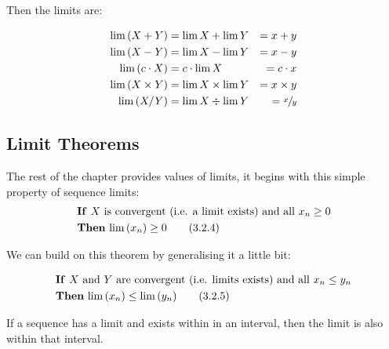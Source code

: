 \documentclass[class=article, crop=false]{standalone}
\begin{document}
Then the limits are:

\begin{alignat}{2}
  \lim  \left( X+Y \right) &= \lim X + \lim Y &= x + y
  \label{addlimdef} \\
  \lim  \left( X-Y \right) &= \lim X - \lim Y &= x - y 
  \label{minlimdef} \\
  \lim  \left( c \cdot X \right) &= c \cdot \lim X  &= c \cdot x
  \label{conmultlimdef} \\
  \lim  \left( X\times Y \right) &= \lim X \times \lim Y &= x \times y
  \label{multlimdef} \\
  \lim  \left( X/Y \right) &= \lim X \div \lim Y &= \sfrac{x}{y} 
  \label{divlimdef}
\end{alignat}







\subsection{Limit Theorems}
The rest of the chapter provides values of limits, it begins with this simple property of sequence limits:
\begin{align}
  &\text{\textbf{If} $X$ is convergent (i.e. a limit exists) and all $x_n\geq 0$}  \notag \\
  &\text{\textbf{Then} $\lim\left( x_{n} \right)\geq 0$} \tag{3.2.4}
  \label{324}
\end{align}

We can build on this theorem by generalising it a little bit:


\begin{align}
  &\text{\textbf{If} $X$ and $Y$ are convergent (i.e. limits exists) and all $x_n\leq y_n$}  \notag \\
  &\text{\textbf{Then} $\lim\left( x_{n} \right)\leq \lim \left( y_n \right)$} \tag{3.2.5}
  \label{325}
\end{align}

  If a sequence has a limit and exists within in an interval, then the limit is also within that interval.
\end{document}

